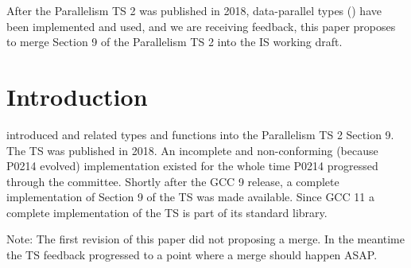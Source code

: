 \newcommand\wgTitle{Merge data-parallel types from the Parallelism TS 2}
\newcommand\wgName{Matthias Kretz <m.kretz@gsi.de>}
\newcommand\wgDocumentNumber{D1928R1}
\newcommand\wgGroup{SG1}
\newcommand\wgTarget{\CC{}23}

\usepackage{mymacros}
\usepackage{wg21}
\setcounter{tocdepth}{2} %
\hypersetup{bookmarksdepth=5}
\usepackage{changelog}
\usepackage{underscore}



\newcommand\simd[1][]{\type{simd#1}\xspace}
\newcommand\simdT{\type{simd<T>}\xspace}
\newcommand\valuetype{\type{value\_type}\xspace}
\newcommand\referencetype{\type{reference}\xspace}
\newcommand\whereexpression{\type{where\_expression}\xspace}
\newcommand\simdcast{\code{simd\_cast}\xspace}
\newcommand\mask[1][]{\type{simd\_mask#1}\xspace}
\newcommand\maskT{\type{simd\_mask<T>}\xspace}
\newcommand\fixedsizeN{\type{simd\_abi::fixed\_size<N>}\xspace}
\newcommand\fixedsizescoped{\type{simd\_abi::fixed\_size}\xspace}
\newcommand\fixedsize{\type{fixed\_size}\xspace}
\newcommand\wglink[1]{\href{https://wg21.link/#1}{#1}}


\begin{wgTitlepage}
  After the Parallelism TS 2 was published in 2018, data-parallel types (\simdT) have been implemented and used, and we are receiving feedback, this paper proposes to merge Section 9 of the Parallelism TS 2 into the IS working draft.
\end{wgTitlepage}

\pagestyle{scrheadings}


%

\section{Introduction}
\cite{P0214R9} introduced \simdT and related types and functions into the Parallelism TS 2 Section 9.
The TS was published in 2018.
An incomplete and non-conforming (because P0214 evolved) implementation existed for the whole time P0214 progressed through the committee.
Shortly after the GCC 9 release, a complete implementation of Section 9 of the TS was made available.
Since GCC 11 a complete  implementation of the TS is part of its standard library.

Note: The first revision of this paper did not proposing a merge.
In the meantime the TS feedback progressed to a point where a merge should happen ASAP.

